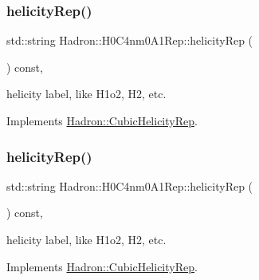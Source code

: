 \mbox{\label{structHadron_1_1H0C4nm0A1Rep_a2c5a6923713010a76a5139a03ae879cf}} 
\subsubsection{\texorpdfstring{helicityRep()}{helicityRep()}\hspace{0.1cm}{\footnotesize\ttfamily [1/2]}}
{\footnotesize\ttfamily std\+::string Hadron\+::\+H0\+C4nm0\+A1\+Rep\+::helicity\+Rep (\begin{DoxyParamCaption}{ }\end{DoxyParamCaption}) const\hspace{0.3cm}{\ttfamily [inline]}, {\ttfamily [virtual]}}

helicity label, like H1o2, H2, etc. 

Implements \mbox{\hyperlink{structHadron_1_1CubicHelicityRep_af1096946b7470edf0a55451cc662f231}{Hadron\+::\+Cubic\+Helicity\+Rep}}.

\mbox{\label{structHadron_1_1H0C4nm0A1Rep_a2c5a6923713010a76a5139a03ae879cf}} 
\subsubsection{\texorpdfstring{helicityRep()}{helicityRep()}\hspace{0.1cm}{\footnotesize\ttfamily [2/2]}}
{\footnotesize\ttfamily std\+::string Hadron\+::\+H0\+C4nm0\+A1\+Rep\+::helicity\+Rep (\begin{DoxyParamCaption}{ }\end{DoxyParamCaption}) const\hspace{0.3cm}{\ttfamily [inline]}, {\ttfamily [virtual]}}

helicity label, like H1o2, H2, etc. 

Implements \mbox{\hyperlink{structHadron_1_1CubicHelicityRep_af1096946b7470edf0a55451cc662f231}{Hadron\+::\+Cubic\+Helicity\+Rep}}.

\mbox{\label{structHadron_1_1H0C4nm0A1Rep_a30712f6aadf0e0304142526d08c2822e}} 

